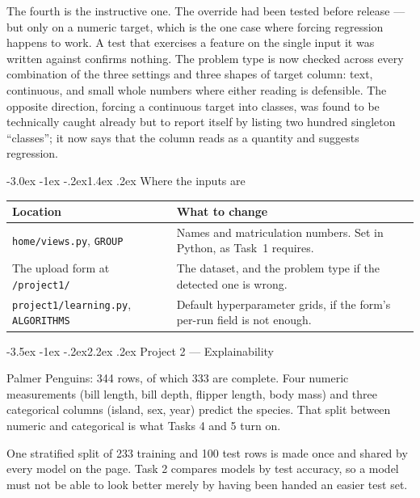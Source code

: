 \documentclass[11pt,a4paper]{article}
\makeatletter
\renewcommand\section{\@startsection{section}{1}{\z@}%
  {-3.5ex \@plus -1ex \@minus -.2ex}{2.2ex \@plus.2ex}%
  {\normalfont\Large\sffamily\bfseries\color{accent}}}
\renewcommand\subsection{\@startsection{subsection}{2}{\z@}%
  {-3.0ex \@plus -1ex \@minus -.2ex}{1.4ex \@plus .2ex}%
  {\normalfont\large\sffamily\bfseries\color{accent}}}
\newcommand{\file}[1]{\texttt{\small #1}}
\makeatother
\begin{document}
The fourth is the instructive one. The override had been tested before release
--- but only on a numeric target, which is the one case where forcing regression
happens to work. A test that exercises a feature on the single input it was
written against confirms nothing. The problem type is now checked across every
combination of the three settings and three shapes of target column: text,
continuous, and small whole numbers where either reading is defensible. The
opposite direction, forcing a continuous target into classes, was found to be
technically caught already but to report itself by listing two hundred singleton
``classes''; it now says that the column reads as a quantity and suggests
regression.

\subsection{Where the inputs are}

\begin{center}
\begin{tabularx}{0.94\textwidth}{@{}lX@{}}
\toprule
\textbf{Location} & \textbf{What to change} \\
\midrule
\file{home/views.py}, \texttt{GROUP} & Names and matriculation numbers. Set in Python, as Task~1 requires. \\
The upload form at \file{/project1/} & The dataset, and the problem type if the detected one is wrong. \\
\file{project1/learning.py}, \texttt{ALGORITHMS} & Default hyperparameter grids, if the form's per-run field is not enough. \\
\bottomrule
\end{tabularx}
\end{center}


\section{Project 2 --- Explainability}

Palmer Penguins: 344 rows, of which 333 are complete. Four numeric measurements
(bill length, bill depth, flipper length, body mass) and three categorical
columns (island, sex, year) predict the species. That split between numeric and
categorical is what Tasks 4 and 5 turn on.

One stratified split of 233 training and 100 test rows is made once and shared by
every model on the page. Task 2 compares models by test accuracy, so a model must
not be able to look better merely by having been handed an easier test set.
\end{document}
